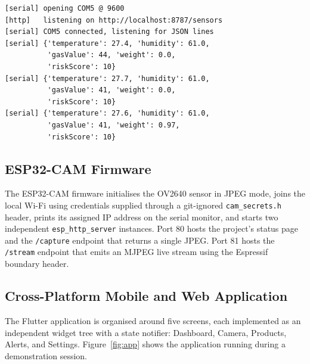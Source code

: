 \begin{lstlisting}[caption={Bridge log during a demonstration session.},label=lst:bridgelog]
[serial] opening COM5 @ 9600
[http]   listening on http://localhost:8787/sensors
[serial] COM5 connected, listening for JSON lines
[serial] {'temperature': 27.4, 'humidity': 61.0,
          'gasValue': 44, 'weight': 0.0,
          'riskScore': 10}
[serial] {'temperature': 27.7, 'humidity': 61.0,
          'gasValue': 41, 'weight': 0.0,
          'riskScore': 10}
[serial] {'temperature': 27.6, 'humidity': 61.0,
          'gasValue': 41, 'weight': 0.97,
          'riskScore': 10}
\end{lstlisting}

\subsection{ESP32-CAM Firmware}
\label{sec:impl-cam}

The ESP32-CAM firmware initialises the OV2640 sensor in JPEG mode,
joins the local Wi-Fi using credentials supplied through a
git-ignored \texttt{cam\_secrets.h} header, prints its assigned IP
address on the serial monitor, and starts two independent
\texttt{esp\_http\_server} instances. Port 80 hosts the project's
status page and the \texttt{/capture} endpoint that returns a single
JPEG. Port 81 hosts the \texttt{/stream} endpoint that emits an MJPEG
live stream using the Espressif boundary header.

\subsection{Cross-Platform Mobile and Web Application}
\label{sec:impl-app}

The Flutter application is organised around five screens, each
implemented as an independent widget tree with a state notifier:
Dashboard, Camera, Products, Alerts, and Settings.
Figure~\ref{fig:app} shows the application running during a
demonstration session.


